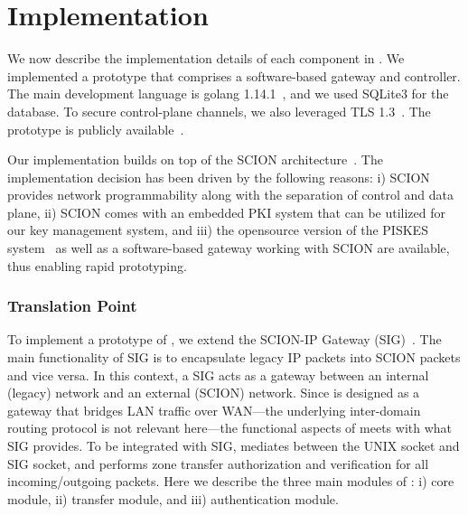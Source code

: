 \chapter{Implementation}
\label{impl}

We now describe the implementation details of each component in \name. 
We implemented a prototype that comprises a software-based gateway and controller.
The main development language is golang 1.14.1~\cite{golang2020}, and we used SQLite3
\cite{sqlite2020} for the database. To secure control-plane channels, we also leveraged 
TLS 1.3~\cite{rfc8446}. The prototype is publicly available~\cite{claude2020code}. 

Our implementation builds on top of the SCION architecture~\cite{Perrig2017}. 
The implementation decision has been driven by the following reasons: i) SCION provides 
network programmability along with the separation of control and data plane, ii) SCION comes 
with an embedded PKI system that can be utilized for our key management system, and 
iii) the opensource version of the PISKES system~\cite{benjamin2020code} as well as a 
software-based gateway working with SCION are available, thus enabling rapid prototyping. 


\subsection{Translation Point}
\label{ssec:tp}

To implement a prototype of \tp, we extend the SCION-IP Gateway (SIG)~\cite{sig2020code}.
The main functionality of SIG is to encapsulate legacy IP packets into SCION packets and 
vice versa. In this context, a SIG acts as a gateway between an internal (legacy) network 
and an external (SCION) network. Since \tp is designed as a gateway that bridges LAN 
traffic over WAN---the underlying inter-domain routing protocol is not relevant here---the 
functional aspects of \tp meets with what SIG provides. To be integrated with SIG, \tp
mediates between the UNIX socket and SIG socket, and performs zone transfer authorization 
and verification for all incoming/outgoing packets. 
Here we describe the three main modules of \tp: i) core module, ii) transfer module, and iii) authentication module. 


